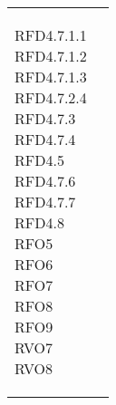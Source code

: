 \begin{longtable}[H]{| >{\centering\bfseries}p{8cm} | >{\centering\arraybackslash}p{8cm} |}
{    RFD4.7.1.1                                                                                                   \\
    RFD4.7.1.2                                                                                                   \\
    RFD4.7.1.3                                                                                                   \\
    RFD4.7.2.4                                                                                                   \\
    RFD4.7.3                                                                                                     \\
    RFD4.7.4                                                                                                     \\
    RFD4.5                                                                                                       \\
    RFD4.7.6                                                                                                     \\
    RFD4.7.7                                                                                                     \\
    RFD4.8                                                                                                       \\
    RFO5                                                                                                         \\
    RFO6                                                                                                         \\
    RFO7                                                                                                         \\
    RFO8                                                                                                         \\
    RFO9                                                                                                         \\
    RVO7                                                                                                         \\
    RVO8                                                                                                         \\
        \rule{0pt}{2ex}
    }                                                                                                            \\


\end{longtable}
